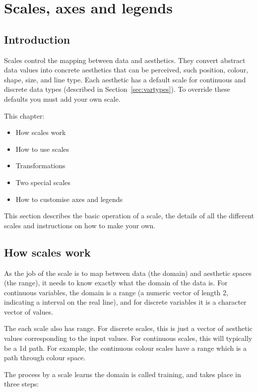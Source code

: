 
\chapter{Scales, axes and legends}

\section{Introduction}

Scales control the mapping between data and aesthetics.  They convert abstract data values into concrete aesthetics that can be perceived, such position, colour, shape, size, and line type.  Each aesthetic has a default scale for continuous and discrete data types (described in Section~\ref{sec:vartypes}).  To override these defaults you must add your own scale.  

This chapter:

\begin{itemize}
  \item How scales work
  \item How to use scales
  \item Transformations
  \item Two special scales
  \item How to customise axes and legends
\end{itemize}

This section describes the basic operation of a scale, the details of all the different scales and instructions on how to make your own.

\section{How scales work}

As the job of the scale is to map between data (the domain) and aesthetic spaces (the range), it needs to know exactly what the domain of the data is. For continuous variables, the domain is a range (a numeric vector of length 2, indicating a interval on the real line), and for discrete variables it is a character vector of values.  

The each scale also has range.  For discrete scales, this is just a vector of aesthetic values corresponding to the input values.  For continuous scales, this will typically be a 1d path.  For example, the continuous colour scales have a range which is a path through colour space.

The process by a scale learns the domain is called training, and takes place in three steps:

